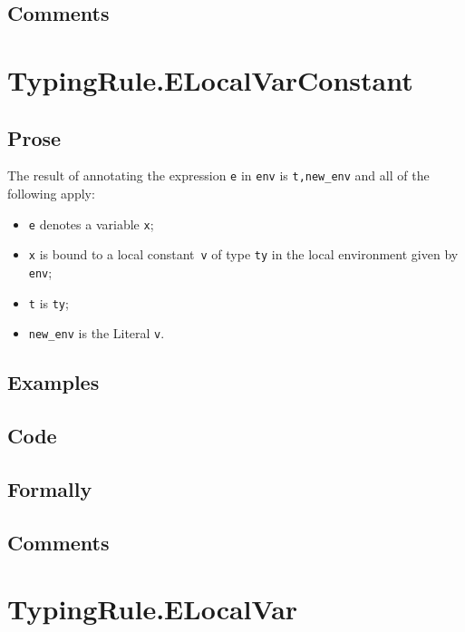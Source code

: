 \documentclass{book}
\begin{document}
  \subsection{Comments}

\section{TypingRule.ELocalVarConstant \label{sec:TypingRule.ELocalVarConstant}}

  \subsection{Prose}
  The result of annotating the expression \texttt{e} in \texttt{env} is
\texttt{t,new\_env} and all of the following apply:  
  \begin{itemize}
  \item \texttt{e} denotes a variable \texttt{x};
  \item \texttt{x} is bound to a local constant~\texttt{v} of type \texttt{ty} in the local environment given by \texttt{env};
  \item \texttt{t} is \texttt{ty};
  \item \texttt{new\_env} is the Literal \texttt{v}.
  \end{itemize}

  \subsection{Examples}

  \subsection{Code}

  \subsection{Formally}

  \subsection{Comments}

\section{TypingRule.ELocalVar \label{sec:TypingRule.ELocalVar}}
\end{document}
